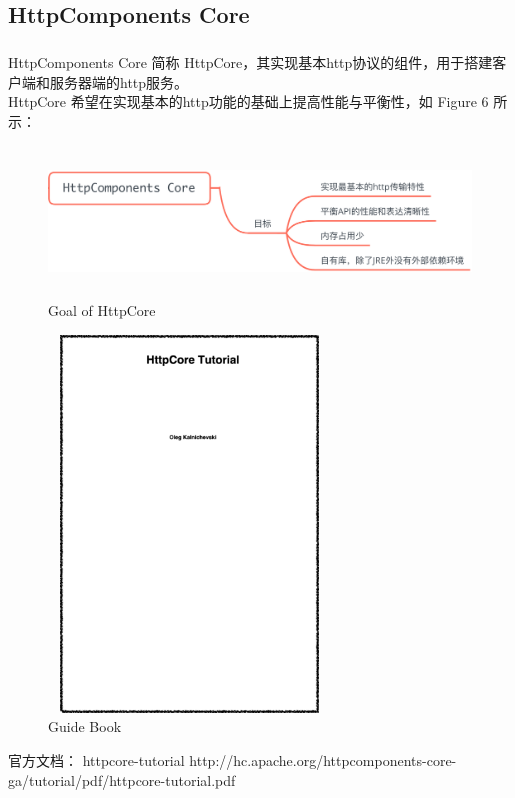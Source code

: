 \documentclass{article}
\begin{document}
	\subsection{HttpComponents Core}
	\begin{CJK}{UTF8}{gbsn}
		\subparagraph{}
		HttpComponents Core 简称 HttpCore，其实现基本http协议的组件，用于搭建客户端和服务器端的http服务。\\
		HttpCore 希望在实现基本的http功能的基础上提高性能与平衡性，如 Figure 6 所示：\\
		\begin{figure}[H]
		\centering
		\includegraphics[height = 4cm, width = 16cm]{pics/9_target.png}	
		\caption{Goal of HttpCore}
		\end{figure}
		\begin{figure}[H]
		\centering
		\includegraphics[height = 10cm, width = 7.5cm]{pics/7_guide_book.png}	
		\caption{Guide Book}
		\end{figure}
		官方文档： httpcore-tutorial http://hc.apache.org/httpcomponents-core-ga/tutorial/pdf/httpcore-tutorial.pdf
	\end{CJK}{}
\end{document}
